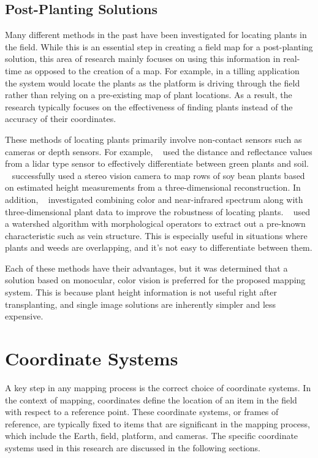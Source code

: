 \subsection{Post-Planting Solutions}

Many different methods in the past have been investigated for locating plants in the field.  While this is an essential step in creating a field map for a post-planting solution, this area of research mainly focuses on using this information in real-time as opposed to the creation of a map.  For example, in a tilling application the system would locate the plants as the platform is driving through the field rather than relying on a pre-existing map of plant locations.  As a result, the research typically focuses on the effectiveness of finding plants instead of the accuracy of their coordinates.  

These methods of locating plants primarily involve non-contact sensors such as cameras or depth sensors.  For example, ~\citep{Andujar:2013} used the distance and reflectance values from a \ac{lidar} type sensor to effectively differentiate between green plants and soil. ~\citep{Kise:2005} successfully used a stereo vision camera to map rows of soy bean plants based on estimated height measurements from a three-dimensional reconstruction.  In addition, ~\citep{Panneton:2014} investigated combining color and near-infrared spectrum along with three-dimensional plant data to improve the robustness of locating plants.  ~\citep{Soille:2000} used a watershed algorithm with morphological operators to extract out a pre-known characteristic such as vein structure.  This is especially useful in situations where plants and weeds are overlapping, and it's not easy to differentiate between them.

Each of these methods have their advantages, but it was determined that a solution based on monocular, color vision is preferred for the proposed mapping system.  This is because plant height information is not useful right after transplanting, and single image solutions are inherently simpler and less expensive. 

\section{Coordinate Systems}

A key step in any mapping process is the correct choice of coordinate systems.  In the context of mapping, coordinates define the location of an item in the field with respect to a reference point.  These coordinate systems, or frames of reference, are typically fixed to items that are significant in the mapping process, which include the Earth, field, platform, and cameras.  The specific coordinate systems used in this research are discussed in the following sections.

